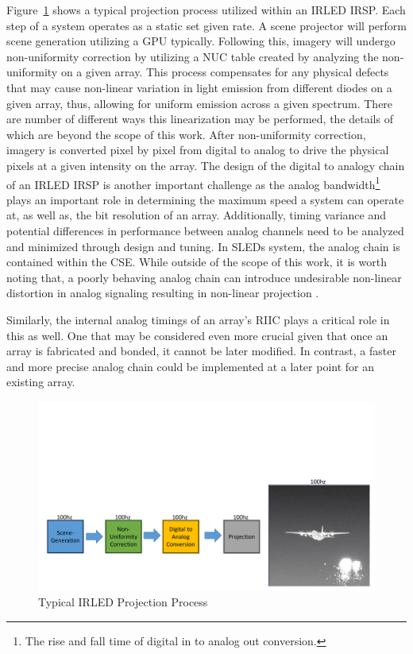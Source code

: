     Figure~\ref{fig:typical_projection} shows a typical projection process utilized within an IRLED IRSP. Each step of a system operates as a static set given rate. A scene projector will perform scene generation utilizing a GPU typically. Following this, imagery will undergo non-uniformity correction by utilizing a NUC table created by analyzing the non-uniformity on a given array. This process compensates for any physical defects that may cause non-linear variation in light emission from different diodes on a given array, thus, allowing for uniform emission across a given spectrum. There are number of different ways this linearization may be performed\cite{BrowningEtAl2016, LandwehrEtAl2017, BarakhshanEtAl2019}, the details of which are beyond the scope of this work. After non-uniformity correction, imagery is converted pixel by pixel from digital to analog to drive the physical pixels at a given intensity on the array. The design of the digital to analogy chain of an IRLED IRSP is another important challenge as the analog bandwidth\footnote{The rise and fall time of digital in to analog out conversion.} plays an important role in determining the maximum speed a system can operate at, as well as, the bit resolution of an array. Additionally, timing variance and potential differences in performance between analog channels need to be analyzed and minimized through design and tuning. In SLEDs system, the analog chain is contained within the CSE. While outside of the scope of this work, it is worth noting that, a poorly behaving analog chain can introduce undesirable non-linear distortion in analog signaling resulting in non-linear projection \cite{freeman1977slewing, gordon1978linear, ChanEtAl2008}.

    Similarly, the internal analog timings of an array's RIIC plays a critical role in this as well. One that may be considered even more crucial given that once an array is fabricated and bonded, it cannot be later modified. In contrast, a faster and more precise analog chain could be implemented at a later point for an existing array.

    \begin{figure}
        \centering
        \includegraphics[trim=0in 0.5in 0in 1.5in,width=1.0\textwidth]{fig/typical_projection_system.pdf}
        \caption{Typical IRLED Projection Process}
        \label{fig:typical_projection}
    \end{figure}




